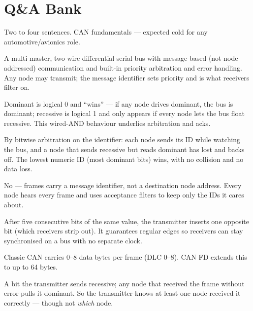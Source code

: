 \section{Q\&A Bank}

%
{Two to four sentences. CAN fundamentals --- expected cold for any
automotive/avionics role.}

A multi-master, two-wire differential serial bus with message-based (not
node-addressed) communication and built-in priority arbitration and error
handling. Any node may transmit; the message identifier sets priority and is
what receivers filter on.

Dominant is logical 0 and ``wins'' --- if any node drives dominant, the bus is
dominant; recessive is logical 1 and only appears if every node lets the bus
float recessive. This wired-AND behaviour underlies arbitration and acks.

By bitwise arbitration on the identifier: each node sends its ID while watching
the bus, and a node that sends recessive but reads dominant has lost and backs
off. The lowest numeric ID (most dominant bits) wins, with no collision and no
data loss.

No --- frames carry a message identifier, not a destination node address. Every
node hears every frame and uses acceptance filters to keep only the IDs it cares
about.

After five consecutive bits of the same value, the transmitter inserts one
opposite bit (which receivers strip out). It guarantees regular edges so
receivers can stay synchronised on a bus with no separate clock.

Classic CAN carries 0--8 data bytes per frame (DLC 0--8). CAN FD extends this to
up to 64 bytes.

A bit the transmitter sends recessive; any node that received the frame without
error pulls it dominant. So the transmitter knows at least one node received it
correctly --- though not \emph{which} node.

